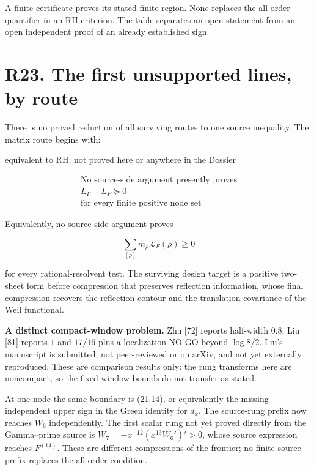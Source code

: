 \documentclass[
  11pt,
]{book}
\begin{document}
A finite certificate proves its stated finite region. None replaces the
all-order quantifier in an RH criterion. The table separates an open
statement from an open independent proof of an already established sign.

\section{R23. The first unsupported lines, by
route}\label{r23.-the-first-unsupported-lines-by-route}

There is no proved reduction of all surviving routes to one source
inequality. The matrix route begins with:

\begin{tnopen}{equivalent to RH; not proved here or anywhere in the Dossier}

\[
\boxed{\begin{gathered}
\text{No source-side argument presently proves}\\
L_\Gamma-L_P\succeq0\\
\text{for every finite positive node set}
\end{gathered}}
\tag{23.1}
\]

\end{tnopen}

Equivalently, no source-side argument proves

\[
\sum_{[\rho]}m_\rho\mathscr L_F(\rho)\ge0
\tag{23.2}
\]

for every rational-resolvent test. The surviving design target is a
positive two-sheet form before compression that preserves reflection
information, whose final compression recovers the reflection contour and
the translation covariance of the Weil functional.

\textbf{A distinct compact-window problem.} Zhu {[}72{]} reports
half-width \(0.8\); Liu {[}81{]} reports \(1\) and \(17/16\) plus a
localization NO-GO beyond \(\log8/2\). Liu's manuscript is submitted,
not peer-reviewed or on arXiv, and not yet externally reproduced. These
are comparison results only: the rung transforms here are noncompact, so
the fixed-window bounds do not transfer as stated.

At one node the same boundary is (21.14), or equivalently the missing
independent upper sign in the Green identity for \(d_x\). The
source-rung prefix now reaches \(W_6\) independently. The first scalar
rung not yet proved directly from the Gamma--prime source is
\(W_7=-x^{-12}(x^{13}W_6')'>0\), whose source expression reaches
\(F^{(14)}\). These are different compressions of the frontier; no
finite source prefix replaces the all-order condition.
\end{document}
